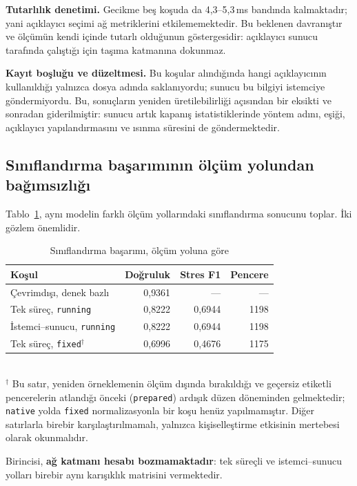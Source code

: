 \documentclass[conference]{IEEEtran}
\newcommand{\ms}{\,ms\xspace}
\begin{document}
\textbf{Tutarlılık denetimi.} Gecikme beş koşuda da 4{,}3--5{,}3\ms bandında
kalmaktadır; yani açıklayıcı seçimi ağ metriklerini etkilememektedir. Bu
beklenen davranıştır ve ölçümün kendi içinde tutarlı olduğunun göstergesidir:
açıklayıcı sunucu tarafında çalıştığı için taşıma katmanına dokunmaz.

\textbf{Kayıt boşluğu ve düzeltmesi.} Bu koşular alındığında hangi açıklayıcının
kullanıldığı yalnızca dosya adında saklanıyordu; sunucu bu bilgiyi istemciye
göndermiyordu. Bu, sonuçların yeniden üretilebilirliği açısından bir eksikti ve
sonradan giderilmiştir: sunucu artık kapanış istatistiklerinde yöntem adını,
eşiği, açıklayıcı yapılandırmasını ve ısınma süresini de göndermektedir.

\subsection{Sınıflandırma başarımının ölçüm yolundan bağımsızlığı}

Tablo~\ref{tab:siniflama}, aynı modelin farklı ölçüm yollarındaki sınıflandırma
sonucunu toplar. İki gözlem önemlidir.

\begin{table}[t]
\caption{Sınıflandırma başarımı, ölçüm yoluna göre}
\label{tab:siniflama}
\centering
\small
\begin{tabular}{lrrr}
\toprule
\textbf{Koşul} & \textbf{Doğruluk} & \textbf{Stres F1} & \textbf{Pencere}\\
\midrule
Çevrimdışı, denek bazlı & 0{,}9361 & --- & ---\\
Tek süreç, \texttt{running}    & 0{,}8222 & 0{,}6944 & 1198\\
İstemci--sunucu, \texttt{running} & 0{,}8222 & 0{,}6944 & 1198\\
Tek süreç, \texttt{fixed}$^{\dagger}$ & 0{,}6996 & 0{,}4676 & 1175\\
\bottomrule
\end{tabular}
\\[2pt]
\footnotesize $^{\dagger}$ Bu satır, yeniden örneklemenin ölçüm dışında
bırakıldığı ve geçersiz etiketli pencerelerin atlandığı önceki
(\texttt{prepared}) ardışık düzen döneminden gelmektedir; \texttt{native} yolda
\texttt{fixed} normalizasyonla bir koşu henüz yapılmamıştır. Diğer satırlarla
birebir karşılaştırılmamalı, yalnızca kişiselleştirme etkisinin mertebesi
olarak okunmalıdır.
\end{table}

Birincisi, \textbf{ağ katmanı hesabı bozmamaktadır}: tek süreçli ve
istemci--sunucu yolları birebir aynı karışıklık matrisini vermektedir.
\end{document}
